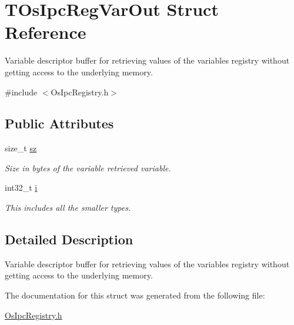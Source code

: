 \hypertarget{structTOsIpcRegVarOut}{}\section{T\+Os\+Ipc\+Reg\+Var\+Out Struct Reference}
\label{structTOsIpcRegVarOut}


Variable descriptor buffer for retrieving values of the variables registry without getting access to the underlying memory.  




{\ttfamily \#include $<$Os\+Ipc\+Registry.\+h$>$}

\subsection*{Public Attributes}
\begin{DoxyCompactItemize}
\item 
\mbox{\label{structTOsIpcRegVarOut_aadc42a240380abc6b62eb41bfb7e1c09}} 
size\+\_\+t \hyperlink{structTOsIpcRegVarOut_aadc42a240380abc6b62eb41bfb7e1c09}{sz}
\begin{DoxyCompactList}\small\item\em Size in bytes of the variable retrieved variable. \end{DoxyCompactList}\item 
\mbox{\label{structTOsIpcRegVarOut_a90eba908f867d96d6722f3dc62f03bce}} 
int32\+\_\+t \hyperlink{structTOsIpcRegVarOut_a90eba908f867d96d6722f3dc62f03bce}{i}
\begin{DoxyCompactList}\small\item\em This includes all the smaller types. \end{DoxyCompactList}\end{DoxyCompactItemize}


\subsection{Detailed Description}
Variable descriptor buffer for retrieving values of the variables registry without getting access to the underlying memory. 



The documentation for this struct was generated from the following file\+:\begin{DoxyCompactItemize}
\item 
\hyperlink{OsIpcRegistry_8h}{Os\+Ipc\+Registry.\+h}\end{DoxyCompactItemize}
